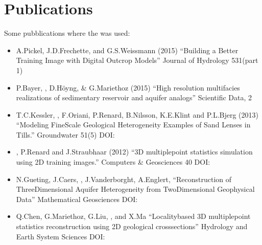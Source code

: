 \documentclass[letterpaper,10pt,english]{sphinxmanual}
\begin{document}
\chapter{Publications}
\label{\detokenize{publications:publications}}\label{\detokenize{publications::doc}}
Some pubblications where the  was used:
\begin{itemize}
\item {} 
A.Pickel, J.D.Frechette,  and G.S.Weissmann (2015)
“Building a Better Training Image with Digital Outcrop Models” \sphinxhyphen{}
Journal of Hydrology 531(part 1) 

\item {} 
P.Bayer, , D.Höyng, \& G.Mariethoz
(2015) “High resolution multi\sphinxhyphen{}facies realizations of sedimentary reservoir
and aquifer analogs” \sphinxhyphen{} Scientific Data, 2  \sphinxhyphen{} 

\item {} 
T.C.Kessler, , F.Oriani, P.Renard, B.Nilsson,
K.E.Klint and P.L.Bjerg (2013) “Modeling Fine\sphinxhyphen{}Scale Geological
Heterogeneity \sphinxhyphen{} Examples of Sand Lenses in Tills.”  Groundwater
51(5) DOI: 

\item {} 
, P.Renard and J.Straubhaar (2012)
“3D multiple\sphinxhyphen{}point statistics simulation using 2D training images.”
Computers \& Geosciences   40
DOI: 
\sphinxhyphen{} 

\item {} 
N.Gueting, J.Caers, , J.Vanderborght, A.Englert,
“Reconstruction of Three\sphinxhyphen{}Dimensional Aquifer Heterogeneity from
Two\sphinxhyphen{}Dimensional Geophysical Data” \sphinxhyphen{} Mathematical Geosciences
\sphinxhyphen{} DOI:  \sphinxhyphen{} 

\item {} 
Q.Chen, G.Mariethoz, G.Liu, , and X.Ma
“Locality\sphinxhyphen{}based 3\sphinxhyphen{}D multiple\sphinxhyphen{}point statistics reconstruction using 2\sphinxhyphen{}D geological cross\sphinxhyphen{}sections” \sphinxhyphen{}
Hydrology and Earth System Sciences \sphinxhyphen{} DOI:  \sphinxhyphen{} 

\end{itemize}
\end{document}
